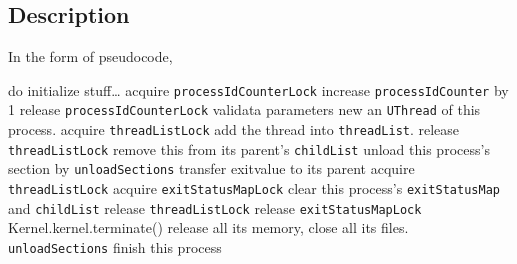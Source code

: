 \documentclass{article}
\begin{document}
\subsection{Description}
In the form of pseudocode,
\begin{algorithm*}
    \begin{algorithmic}
					\State do initialize stuff\dots
					\State acquire \texttt{processIdCounterLock}
					\State increase \texttt{processIdCounter} by 1
					\State release \texttt{processIdCounterLock}
				\EndProcedure
					\State validata parameters
					\State new an \texttt{UThread} of this process.
					\State acquire \texttt{threadListLock}
					\State add the thread into \texttt{threadList}.
					\State release \texttt{threadListLock}
				\EndProcedure
            \State remove this from its parent's \texttt{childList}
						\State unload this process's section by \texttt{unloadSections}
            \State transfer exitvalue to its parent
						\State acquire \texttt{threadListLock}
						\State acquire \texttt{exitStatusMapLock}
            \State clear this process's \texttt{exitStatusMap} and \texttt{childList}
						\State release \texttt{threadListLock}
						\State release \texttt{exitStatusMapLock}
                \State Kernel.kernel.terminate()
            \Else
								\State release all its memory, close all its files.
								\State \texttt{unloadSections}
                \State finish this process
            \EndIf
        \EndProcedure
		\end{algorithmic}
\end{algorithm*}
\end{document}
